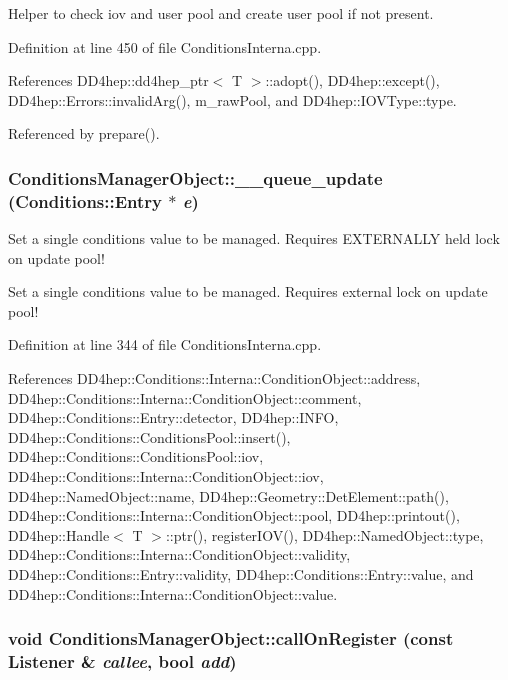 Helper to check iov and user pool and create user pool if not present. 

Definition at line 450 of file ConditionsInterna.cpp.

References DD4hep::dd4hep\_\-ptr$<$ T $>$::adopt(), DD4hep::except(), DD4hep::Errors::invalidArg(), m\_\-rawPool, and DD4hep::IOVType::type.

Referenced by prepare().\hypertarget{class_d_d4hep_1_1_conditions_1_1_conditions_manager_object_ad22280768d433c68fabe8709a1bb6fda}{
\subsubsection[{\_\-\_\-queue\_\-update}]{ ConditionsManagerObject::\_\-\_\-queue\_\-update ({\bf Conditions::Entry} $\ast$ {\em e})}}
\label{class_d_d4hep_1_1_conditions_1_1_conditions_manager_object_ad22280768d433c68fabe8709a1bb6fda}
Set a single conditions value to be managed. Requires EXTERNALLY held lock on update pool!

Set a single conditions value to be managed. Requires external lock on update pool! 

Definition at line 344 of file ConditionsInterna.cpp.

References DD4hep::Conditions::Interna::ConditionObject::address, DD4hep::Conditions::Interna::ConditionObject::comment, DD4hep::Conditions::Entry::detector, DD4hep::INFO, DD4hep::Conditions::ConditionsPool::insert(), DD4hep::Conditions::ConditionsPool::iov, DD4hep::Conditions::Interna::ConditionObject::iov, DD4hep::NamedObject::name, DD4hep::Geometry::DetElement::path(), DD4hep::Conditions::Interna::ConditionObject::pool, DD4hep::printout(), DD4hep::Handle$<$ T $>$::ptr(), registerIOV(), DD4hep::NamedObject::type, DD4hep::Conditions::Interna::ConditionObject::validity, DD4hep::Conditions::Entry::validity, DD4hep::Conditions::Entry::value, and DD4hep::Conditions::Interna::ConditionObject::value.\hypertarget{class_d_d4hep_1_1_conditions_1_1_conditions_manager_object_a74aa106c194fb9ca929c8cf523632ce3}{
\subsubsection[{callOnRegister}]{\setlength{\rightskip}{0pt plus 5cm}void ConditionsManagerObject::callOnRegister (const {\bf Listener} \& {\em callee}, \/  bool {\em add})}}
\label{class_d_d4hep_1_1_conditions_1_1_conditions_manager_object_a74aa106c194fb9ca929c8cf523632ce3}


